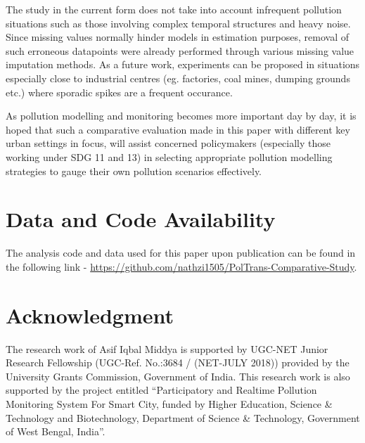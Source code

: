 \documentclass[10pt,journal]{IEEEtran}
\begin{document}
The study in the current form does not take into account infrequent pollution situations such as those involving complex temporal structures and heavy noise. Since missing values normally hinder models in estimation purposes, removal of such erroneous datapoints were already performed through various missing value imputation methods. As a future work, experiments can be proposed in situations especially close to industrial centres (eg. factories, coal mines, dumping grounds etc.) where sporadic spikes are a frequent occurance.

As pollution modelling and monitoring becomes more important day by day, it is hoped that such a comparative evaluation made in this paper with different key urban settings in focus, will assist concerned policymakers (especially those working under SDG 11 and 13) in selecting appropriate pollution modelling strategies to gauge their own pollution scenarios effectively.

\section*{Data and Code Availability}
The analysis code and data used for this paper upon publication can be found in the following link - \url{https://github.com/nathzi1505/PolTrans-Comparative-Study}.

\section*{Acknowledgment}
The research work of Asif Iqbal Middya is supported by UGC-NET Junior Research Fellowship (UGC-Ref. No.:3684 / (NET-JULY 2018)) provided by the University Grants Commission, Government of India. This research work is also supported by the project entitled ``Participatory and Realtime Pollution Monitoring System For Smart City, funded by Higher Education, Science \& Technology and Biotechnology, Department of Science \& Technology, Government of West Bengal, India''.

\ifCLASSOPTIONcaptionsoff
\newpage
\fi



\end{document}
